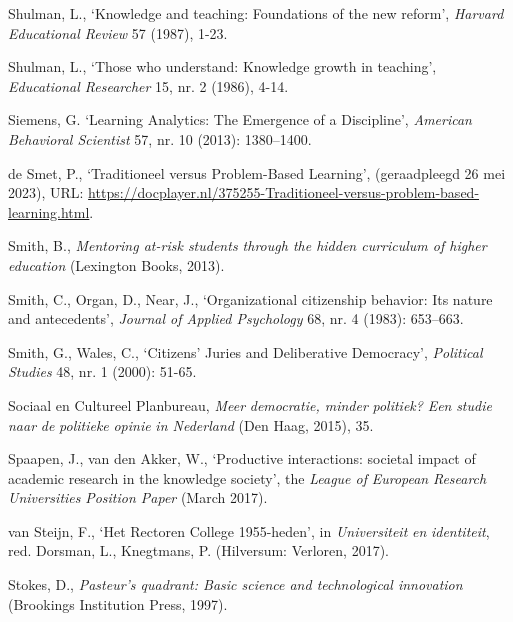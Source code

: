 \documentclass[smallauthor, chapterhaspagenum, nochapterinheader, pagenuminheader,  bigchapnum,medium2, tocpages, garamond, titleinheader]{jote-book}
\begin{document}
\begin{references}
		Shulman, L., ‘Knowledge and teaching: Foundations of the new reform', \emph{Harvard Educational Review} 57 (1987), 1-23.



		Shulman, L., ‘Those who understand: Knowledge growth in teaching', \emph{Educational Researcher} 15, nr. 2 (1986), 4-14.



		Siemens, G. ‘Learning Analytics: The Emergence of a Discipline', \emph{American Behavioral Scientist} 57, nr. 10 (2013): 1380--1400.



		de Smet, P., ‘Traditioneel versus Problem-Based Learning', (geraadpleegd 26 mei 2023), URL: \href{https://docplayer.nl/375255-Traditioneel-versus-problem-based-learning.html}{https://docplayer.nl/375255-Traditioneel-versus-problem-based-learning.html}.



		Smith, B., \emph{Mentoring at-risk students through the hidden curriculum of higher education} (Lexington Books, 2013).



		Smith, C., Organ, D., Near, J., ‘Organizational citizenship behavior: Its nature and antecedents', \emph{Journal of Applied Psychology} 68, nr. 4 (1983): 653--663.



		Smith, G., Wales, C., ‘Citizens' Juries and Deliberative Democracy', \emph{Political Studies} 48, nr. 1 (2000): 51-65.



		Sociaal en Cultureel Planbureau, \emph{Meer }\emph{democratie}\emph{, minder }\emph{politiek}\emph{? }\emph{Een}\emph{ }\emph{studie}\emph{ }\emph{naar}\emph{ de }\emph{politieke}\emph{ }\emph{opinie}\emph{ in Nederland} (Den Haag, 2015), 35.



		Spaapen, J., van den Akker, W., ‘Productive interactions: societal impact of academic research in the knowledge society', the \emph{L}\emph{eague of }\emph{E}\emph{uropean }\emph{R}\emph{esearch }\emph{U}\emph{niversities}\emph{ Position Paper} (March 2017).



		van Steijn, F., ‘Het Rectoren College 1955-heden', in \emph{Universiteit }\emph{en}\emph{ }\emph{identiteit}, red. Dorsman, L., Knegtmans, P. (Hilversum: Verloren, 2017).



		Stokes, D., \emph{Pasteur's quadrant: Basic science and technological innovation} (Brookings Institution Press, 1997).




\end{references}
\end{document}
